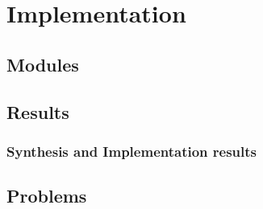 \section{Implementation}
	\subsection{Modules}
	\subsection{Results}
		\subsubsection{Synthesis and Implementation results}
	\subsection{Problems}
